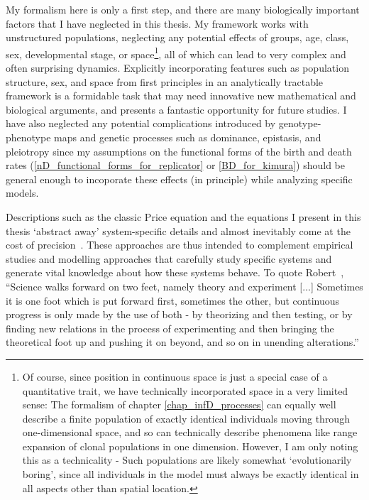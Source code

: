 My formalism here is only a first step, and there are many biologically important factors that I have neglected in this thesis. My framework works with unstructured populations, neglecting any potential effects of groups, age, class, sex, developmental stage, or space\footnote{Of course,  since position in continuous space is just a special case of a quantitative trait, we have technically incorporated space in a very limited sense: The formalism of chapter \ref{chap_infD_processes} can equally well describe a finite population of exactly identical individuals moving through one-dimensional space, and so can technically describe phenomena like range expansion of clonal populations in one dimension. However, I am only noting this as a technicality - Such populations are likely somewhat `evolutionarily boring', since all individuals in the model must always be exactly identical in all aspects other than spatial location.}, all of which can lead to very complex and often surprising dynamics. Explicitly incorporating features such as population structure, sex, and space from first principles in an analytically tractable framework is a formidable task that may need innovative new mathematical and biological arguments, and presents a fantastic opportunity for future studies. I have also neglected any potential complications introduced by genotype-phenotype maps and genetic processes such as dominance, epistasis, and pleiotropy since my assumptions on the functional forms of the birth and death rates (\eqref{nD_functional_forms_for_replicator} or \eqref{BD_for_kimura}) should be general enough to incoporate these effects (in principle) while analyzing specific models.

Descriptions such as the classic Price equation and the equations I present in this thesis `abstract away' system-specific details and almost inevitably come at the cost of precision~\citep{levins_strategy_1966, potochnik_idealization_2018}. These approaches are thus intended to complement empirical studies and modelling approaches that carefully study specific systems and generate vital knowledge about how these systems behave. To quote Robert~\citet{millikan_electron_1924}, ``Science walks forward on two feet, namely theory and experiment [...] Sometimes it is one foot which is put forward first, sometimes the other, but continuous progress is only made by the use of both - by theorizing and then testing, or by finding new relations in the process of experimenting and then bringing the theoretical foot up and pushing it on beyond, and so on in unending alterations.''